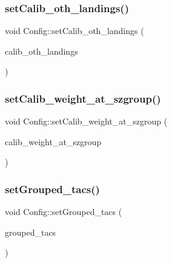 \mbox{\label{class_config_a4d9c889cb646c899b2e3bf88f3fbbb9f}} 
\subsubsection{\texorpdfstring{setCalib\_oth\_landings()}{setCalib\_oth\_landings()}}
{\footnotesize\ttfamily void Config\+::set\+Calib\+\_\+oth\+\_\+landings (\begin{DoxyParamCaption}\item[{const Q\+List$<$ double $>$ \&}]{calib\+\_\+oth\+\_\+landings }\end{DoxyParamCaption})}

\mbox{\label{class_config_a1d4cbc8598711100f6abd67f8d278855}} 
\subsubsection{\texorpdfstring{setCalib\_weight\_at\_szgroup()}{setCalib\_weight\_at\_szgroup()}}
{\footnotesize\ttfamily void Config\+::set\+Calib\+\_\+weight\+\_\+at\+\_\+szgroup (\begin{DoxyParamCaption}\item[{const Q\+List$<$ double $>$ \&}]{calib\+\_\+weight\+\_\+at\+\_\+szgroup }\end{DoxyParamCaption})}

\mbox{\label{class_config_ab3c3dad78f4f4733f6db9c02b6c6444d}} 
\subsubsection{\texorpdfstring{setGrouped\_tacs()}{setGrouped\_tacs()}}
{\footnotesize\ttfamily void Config\+::set\+Grouped\+\_\+tacs (\begin{DoxyParamCaption}\item[{const Q\+List$<$ int $>$ \&}]{grouped\+\_\+tacs }\end{DoxyParamCaption})}

